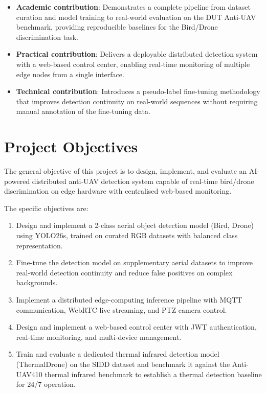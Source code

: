 \documentclass[12pt,a4paper]{report}
\begin{document}
\begin{itemize}
  \item \textbf{Academic contribution}: Demonstrates a complete pipeline
        from dataset curation and model training to real-world evaluation
        on the DUT Anti-UAV benchmark, providing reproducible baselines
        for the Bird/Drone discrimination task.
  \item \textbf{Practical contribution}: Delivers a deployable distributed
        detection system with a web-based control center, enabling real-time
        monitoring of multiple edge nodes from a single interface.
  \item \textbf{Technical contribution}: Introduces a pseudo-label fine-tuning
        methodology that improves detection continuity on real-world sequences
        without requiring manual annotation of the fine-tuning data.
\end{itemize}

\section{Project Objectives}

The general objective of this project is to design, implement, and evaluate
an AI-powered distributed anti-UAV detection system capable of real-time
bird/drone discrimination on edge hardware with centralised web-based monitoring.

The specific objectives are:

\begin{enumerate}
  \item Design and implement a 2-class aerial object detection model (Bird, Drone)
        using YOLO26s, trained on curated RGB datasets with balanced class representation.
  \item Fine-tune the detection model on supplementary aerial datasets to improve
        real-world detection continuity and reduce false positives on complex backgrounds.
  \item Implement a distributed edge-computing inference pipeline with
        MQTT communication, WebRTC live streaming, and PTZ camera control.
  \item Design and implement a web-based control center with JWT authentication,
        real-time monitoring, and multi-device management.
  \item Train and evaluate a dedicated thermal infrared detection model
        (ThermalDrone) on the SIDD dataset and benchmark it against the
        Anti-UAV410 thermal infrared benchmark to establish a thermal
        detection baseline for 24/7 operation.
\end{enumerate}
\end{document}
